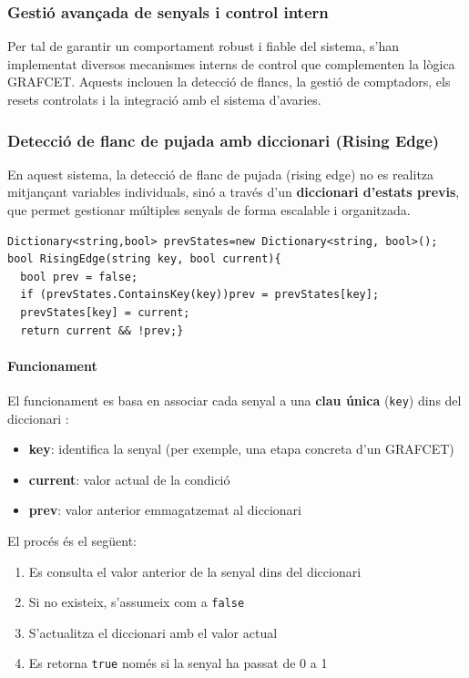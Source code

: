 \documentclass[a4paper,11pt,DIV=13,headings=normal,abstract=true,twoside=semi]{article}
\begin{document}
\subsubsection{Gestió avançada de senyals i control intern}

Per tal de garantir un comportament robust i fiable del sistema, s'han implementat diversos mecanismes interns de control que complementen la lògica GRAFCET. Aquests inclouen la detecció de flancs, la gestió de comptadors, els resets controlats i la integració amb el sistema d'avaries.

\subsubsection*{Detecció de flanc de pujada amb diccionari (Rising Edge)}

En aquest sistema, la detecció de flanc de pujada (rising edge) no es realitza mitjançant variables individuals, sinó a través d'un \textbf{diccionari d'estats previs}, que permet gestionar múltiples senyals de forma escalable i organitzada.

\begin{lstlisting}[style=simple]
Dictionary<string,bool> prevStates=new Dictionary<string, bool>();
bool RisingEdge(string key, bool current){
  bool prev = false;
  if (prevStates.ContainsKey(key))prev = prevStates[key];
  prevStates[key] = current;
  return current && !prev;}
\end{lstlisting}

\paragraph{Funcionament}

El funcionament es basa en associar cada senyal a una \textbf{clau única} (\texttt{key}) dins del diccionari \cite{csharp_dictionary}:

\begin{itemize}
\item \textbf{key}: identifica la senyal (per exemple, una etapa concreta d'un GRAFCET)
\item \textbf{current}: valor actual de la condició
\item \textbf{prev}: valor anterior emmagatzemat al diccionari
\end{itemize}

El procés és el següent:

\begin{enumerate}
\item Es consulta el valor anterior de la senyal dins del diccionari
\item Si no existeix, s'assumeix com a \texttt{false}
\item S'actualitza el diccionari amb el valor actual
\item Es retorna \texttt{true} només si la senyal ha passat de 0 a 1
\end{enumerate}
\end{document}
